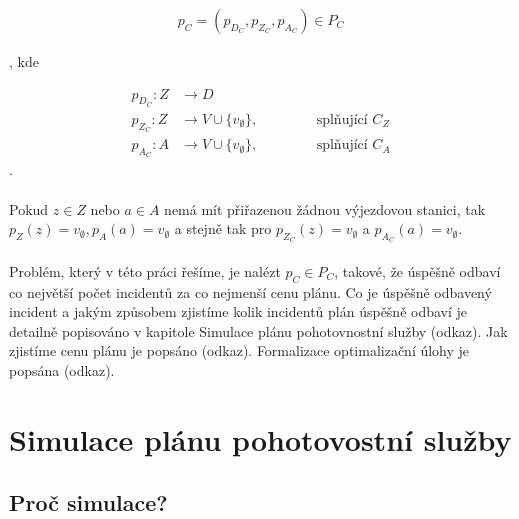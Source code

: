\begin{align}
  p_C = (p_{D_C}, p_{Z_C}, p_{A_C}) \in P_C
\end{align}

\clearpage

, kde

\begin{align}
  p_{D_C} \colon Z &\rightarrow D \\ 
  p_{Z_C} \colon Z &\rightarrow V \cup \{ v_{\emptyset} \},     \hspace{50pt} \text{splňující $C_Z$} \\
  p_{A_C} \colon A &\rightarrow V \cup \{ v_{\emptyset} \},     \hspace{50pt} \text{splňující $C_A$}
\end{align}
.
\\
\\
Pokud $z \in Z$ nebo $a \in A$ nemá mít přiřazenou žádnou výjezdovou stanici, tak $p_{Z}(z) = v_{\emptyset}, p_{A}(a) =  v_{\emptyset}$
a stejně tak pro $p_{Z_C}(z) = v_{\emptyset}$ a $p_{A_C}(a) = v_{\emptyset}$.
\\
\\
Problém, který v této práci řešíme, je nalézt $p_C \in P_C$, takové, že úspěšně odbaví co největší počet incidentů za co nejmenší cenu plánu.
Co je úspěšně odbavený incident a jakým způsobem zjistíme kolik incidentů plán úspěšně odbaví je detailně popisováno v kapitole Simulace plánu pohotovnostní služby (odkaz).
Jak zjistíme cenu plánu je popsáno (odkaz).
Formalizace optimalizační úlohy je popsána (odkaz).

\section{Simulace plánu pohotovostní služby}

\subsection{Proč simulace?}

